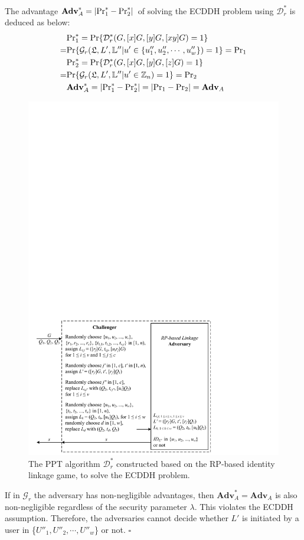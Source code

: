 The advantage $\mathbf{Adv}^*_{A}=|{\rm Pr}^*_1 - {\rm Pr}^*_2|$ of solving the ECDDH problem using $\mathcal{D}^*_r$ is deduced as below:
\begin{align*}
&{\rm Pr}^*_1 =  {\rm Pr}\{\mathcal{D}^*_r(G, [x]G, [y]G, [xy]G)=1\} \\
=&{\rm Pr}\{\mathcal{G}_r(\mathfrak{L}, L', \mathbb{L}'' | u' \in \{{u''_1}, {u''_2}, \cdots, {u''_w}\})=1\} = {\rm Pr}_1 \\
&{\rm Pr}^*_2= {\rm Pr}\{\mathcal{D}^*_r(G, [x]G, [y]G, [z]G)=1\} \\
=&{\rm Pr}\{\mathcal{G}_r(\mathfrak{L}, L', \mathbb{L}'' | u' \in \mathbb{Z}_n)=1\} = {\rm Pr}_2\\
&\mathbf{Adv}^*_{A}=|{\rm Pr}^*_1-{\rm Pr}^*_2|=|{\rm Pr}_1-{\rm Pr}_2|={\mathbf{Adv}}_{A}
\end{align*}

\begin{figure}[tb]
  \centering
  \includegraphics[width=1.0\linewidth]{fig/rp-linkage-game.pdf}
  \caption{The PPT algorithm $\mathcal{D}^*_r$ constructed based on the RP-based identity linkage game, to solve the ECDDH problem.}
  \label{fig:dalgorithm}
\end{figure}


If in $\mathcal{G}_r$ the adversary has non-negligible advantages,
    then $\mathbf{Adv}^*_{A}={\mathbf{Adv}}_{A}$ is also non-negligible regardless of the security parameter $\lambda$.
This violates the ECDDH assumption.
Therefore, the adversaries cannot decide whether $L'$ is initiated by a user in \{${U''_1}, {U''_2}, \cdots, {U''_w}$\} or not.
\hfill $\square$
\oldc

